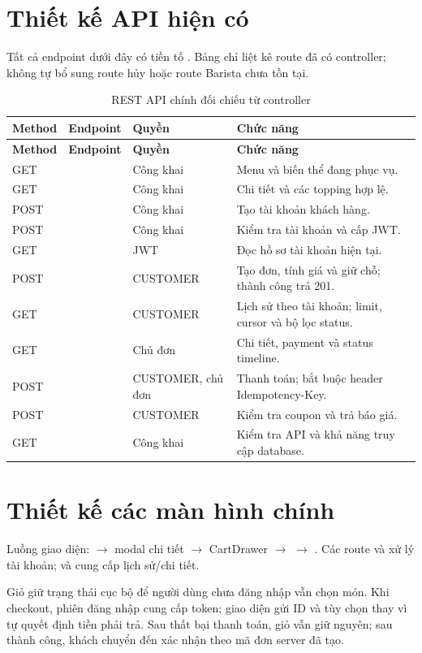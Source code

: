 \section{Thiết kế API hiện có}
Tất cả endpoint dưới đây có tiền tố . Bảng chỉ liệt kê
route đã có controller; không tự bổ sung route hủy hoặc route Barista
chưa tồn tại.
{\small{}
\begin{longtable}{@{}L{0.11\textwidth}L{0.32\textwidth}L{0.17\textwidth}L{0.31\textwidth}@{}}
\caption{REST API chính đối chiếu từ controller}\label{tab:api}\\
\toprule\textbf{Method} & \textbf{Endpoint} & \textbf{Quyền} & \textbf{Chức năng} \\\midrule\endfirsthead
\toprule\textbf{Method} & \textbf{Endpoint} & \textbf{Quyền} & \textbf{Chức năng} \\\midrule\endhead
\bottomrule\endfoot
GET &  & Công khai & Menu và biến thể đang phục vụ. \\
GET &  & Công khai & Chi tiết và các topping hợp lệ. \\
POST &  & Công khai & Tạo tài khoản khách hàng. \\
POST &  & Công khai & Kiểm tra tài khoản và cấp JWT. \\
GET &  & JWT & Đọc hồ sơ tài khoản hiện tại. \\
POST &  & CUSTOMER & Tạo đơn, tính giá và giữ chỗ; thành công trả 201. \\
GET &  & CUSTOMER & Lịch sử theo tài khoản; limit, cursor và bộ lọc status. \\
GET &  & Chủ đơn & Chi tiết, payment và status timeline. \\
POST &  & CUSTOMER, chủ đơn & Thanh toán; bắt buộc header Idempotency-Key. \\
POST &  & CUSTOMER & Kiểm tra coupon và trả báo giá. \\
GET &  & Công khai & Kiểm tra API và khả năng truy cập database. \\
\end{longtable}}

\section{Thiết kế các màn hình chính}
Luồng giao diện:  $\rightarrow$ modal chi tiết
$\rightarrow$ CartDrawer $\rightarrow$ 
$\rightarrow$ . Các route  và
 xử lý tài khoản;  và
 cung cấp lịch sử/chi tiết.

Giỏ giữ trạng thái cục bộ để người dùng chưa đăng nhập vẫn chọn món.
Khi checkout, phiên đăng nhập cung cấp token; giao diện gửi ID và tùy
chọn thay vì tự quyết định tiền phải trả. Sau thất bại thanh toán, giỏ
vẫn giữ nguyên; sau thành công, khách chuyển đến xác nhận theo mã đơn
server đã tạo.
